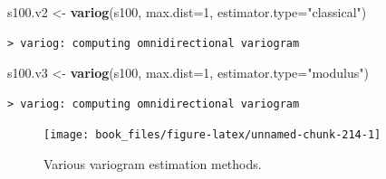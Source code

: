 \documentclass[b5paper,]{scrbook}
\makeatletter
\newenvironment{Shaded}{\begin{snugshade}}{\end{snugshade}}
\newcommand{\KeywordTok}[1]{\textcolor[rgb]{0.13,0.29,0.53}{\textbf{{#1}}}}
\newcommand{\DataTypeTok}[1]{\textcolor[rgb]{0.13,0.29,0.53}{{#1}}}
\newcommand{\DecValTok}[1]{\textcolor[rgb]{0.00,0.00,0.81}{{#1}}}
\newcommand{\StringTok}[1]{\textcolor[rgb]{0.31,0.60,0.02}{{#1}}}
\newcommand{\NormalTok}[1]{{#1}}
\theoremstyle{plain}
\theoremstyle{definition}
\numberwithin{equation}{section}
\newenvironment{kframe}{%
\medskip{}
\setlength{\fboxsep}{.8em}
 \def\at@end@of@kframe{}%
 \ifinner\ifhmode%
  \def\at@end@of@kframe{\end{minipage}}%
  \begin{minipage}{\columnwidth}%
 \fi\fi%
 \def\FrameCommand##1{\hskip\@totalleftmargin \hskip-\fboxsep
 \colorbox{shadecolor}{##1}\hskip-\fboxsep
     \hskip-\linewidth \hskip-\@totalleftmargin \hskip\columnwidth}%
 \MakeFramed {\advance\hsize-\width
   \@totalleftmargin\z@ \linewidth\hsize
   \@setminipage}}%
 {\par\unskip\endMakeFramed%
 \at@end@of@kframe}
\renewenvironment{Shaded}{\begin{kframe}}{\end{kframe}}
\makeatother
\begin{document}
\begin{Shaded}
\begin{Highlighting}[]
\NormalTok{s100.v2 <-}\StringTok{ }\KeywordTok{variog}\NormalTok{(s100, }\DataTypeTok{max.dist=}\DecValTok{1}\NormalTok{, }\DataTypeTok{estimator.type=}\StringTok{"classical"}\NormalTok{)}
\end{Highlighting}
\end{Shaded}

\begin{verbatim}
> variog: computing omnidirectional variogram
\end{verbatim}

\begin{Shaded}
\begin{Highlighting}[]
\NormalTok{s100.v3 <-}\StringTok{ }\KeywordTok{variog}\NormalTok{(s100, }\DataTypeTok{max.dist=}\DecValTok{1}\NormalTok{, }\DataTypeTok{estimator.type=}\StringTok{"modulus"}\NormalTok{)}
\end{Highlighting}
\end{Shaded}

\begin{verbatim}
> variog: computing omnidirectional variogram
\end{verbatim}

\begin{Shaded}
\end{Shaded}

\begin{figure}

{\centering \texttt{[image: book\_files/figure-latex/unnamed-chunk-214-1]} 

}

\caption{Various variogram estimation methods.}\label{fig:unnamed-chunk-214}
\end{figure}
\end{document}
